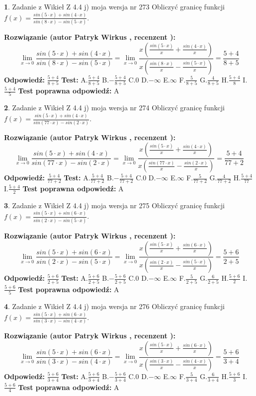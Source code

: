 \documentclass[12pt, a4paper]{article}
\theoremstyle{definition} %
\newtheorem{zad}{}
\newcommand{\zadStart}[1]{\begin{zad}#1\newline}
\newcommand{\zadStop}{\end{zad}}
\newcommand{\rozwStart}[2]{\noindent \textbf{Rozwiązanie (autor #1 , recenzent #2): }\newline}
\newcommand{\rozwStop}{\newline}
\newcommand{\odpStart}{\noindent \textbf{Odpowiedź:}\newline}
\newcommand{\odpStop}{\newline}
\newcommand{\testStart}{\noindent \textbf{Test:}\newline}
\newcommand{\testStop}{\newline}
\newcommand{\kluczStart}{\noindent \textbf{Test poprawna odpowiedź:}\newline}
\newcommand{\kluczStop}{\newline}
\begin{document}
\zadStart{Zadanie z Wikieł Z 4.4 j) moja wersja nr 273}
Obliczyć granicę funkcji $f(x)=\frac{sin(5\cdot x) +sin(4\cdot x)}{sin(8\cdot x) -sin(5\cdot x)}$.
\zadStop
\rozwStart{Patryk Wirkus}{}
$$\lim\limits_{x\to 0}\frac{sin(5\cdot x) +sin(4\cdot x)}{sin(8\cdot x) -sin(5\cdot x)}=\lim\limits_{x\to 0}\frac{x(\frac{sin(5\cdot x)}{x}+\frac{sin(4\cdot x)}{x})}{x(\frac{sin(8\cdot x)}{x}-\frac{sin(5\cdot x)}{x})}=\frac{5+4}{8+5}$$
\rozwStop
\odpStart
$\frac{5+4}{8+5}$
\odpStop
\testStart
A.$\frac{5+4}{8+5}$
B.$-\frac{5+4}{8+5}$
C.$0$
D.$-\infty$
E.$\infty$
F.$\frac{5}{8+5}$
G.$\frac{4}{8+5}$
H.$\frac{5+4}{8}$
I.$\frac{5+4}{5}$
\testStop
\kluczStart
A
\kluczStop



\zadStart{Zadanie z Wikieł Z 4.4 j) moja wersja nr 274}
Obliczyć granicę funkcji $f(x)=\frac{sin(5\cdot x) +sin(4\cdot x)}{sin(77\cdot x) -sin(2\cdot x)}$.
\zadStop
\rozwStart{Patryk Wirkus}{}
$$\lim\limits_{x\to 0}\frac{sin(5\cdot x) +sin(4\cdot x)}{sin(77\cdot x) -sin(2\cdot x)}=\lim\limits_{x\to 0}\frac{x(\frac{sin(5\cdot x)}{x}+\frac{sin(4\cdot x)}{x})}{x(\frac{sin(77\cdot x)}{x}-\frac{sin(2\cdot x)}{x})}=\frac{5+4}{77+2}$$
\rozwStop
\odpStart
$\frac{5+4}{77+2}$
\odpStop
\testStart
A.$\frac{5+4}{77+2}$
B.$-\frac{5+4}{77+2}$
C.$0$
D.$-\infty$
E.$\infty$
F.$\frac{5}{77+2}$
G.$\frac{4}{77+2}$
H.$\frac{5+4}{77}$
I.$\frac{5+4}{2}$
\testStop
\kluczStart
A
\kluczStop



\zadStart{Zadanie z Wikieł Z 4.4 j) moja wersja nr 275}
Obliczyć granicę funkcji $f(x)=\frac{sin(5\cdot x) +sin(6\cdot x)}{sin(2\cdot x) -sin(5\cdot x)}$.
\zadStop
\rozwStart{Patryk Wirkus}{}
$$\lim\limits_{x\to 0}\frac{sin(5\cdot x) +sin(6\cdot x)}{sin(2\cdot x) -sin(5\cdot x)}=\lim\limits_{x\to 0}\frac{x(\frac{sin(5\cdot x)}{x}+\frac{sin(6\cdot x)}{x})}{x(\frac{sin(2\cdot x)}{x}-\frac{sin(5\cdot x)}{x})}=\frac{5+6}{2+5}$$
\rozwStop
\odpStart
$\frac{5+6}{2+5}$
\odpStop
\testStart
A.$\frac{5+6}{2+5}$
B.$-\frac{5+6}{2+5}$
C.$0$
D.$-\infty$
E.$\infty$
F.$\frac{5}{2+5}$
G.$\frac{6}{2+5}$
H.$\frac{5+6}{2}$
I.$\frac{5+6}{5}$
\testStop
\kluczStart
A
\kluczStop



\zadStart{Zadanie z Wikieł Z 4.4 j) moja wersja nr 276}
Obliczyć granicę funkcji $f(x)=\frac{sin(5\cdot x) +sin(6\cdot x)}{sin(3\cdot x) -sin(4\cdot x)}$.
\zadStop
\rozwStart{Patryk Wirkus}{}
$$\lim\limits_{x\to 0}\frac{sin(5\cdot x) +sin(6\cdot x)}{sin(3\cdot x) -sin(4\cdot x)}=\lim\limits_{x\to 0}\frac{x(\frac{sin(5\cdot x)}{x}+\frac{sin(6\cdot x)}{x})}{x(\frac{sin(3\cdot x)}{x}-\frac{sin(4\cdot x)}{x})}=\frac{5+6}{3+4}$$
\rozwStop
\odpStart
$\frac{5+6}{3+4}$
\odpStop
\testStart
A.$\frac{5+6}{3+4}$
B.$-\frac{5+6}{3+4}$
C.$0$
D.$-\infty$
E.$\infty$
F.$\frac{5}{3+4}$
G.$\frac{6}{3+4}$
H.$\frac{5+6}{3}$
I.$\frac{5+6}{4}$
\testStop
\kluczStart
A
\kluczStop
\end{document}
